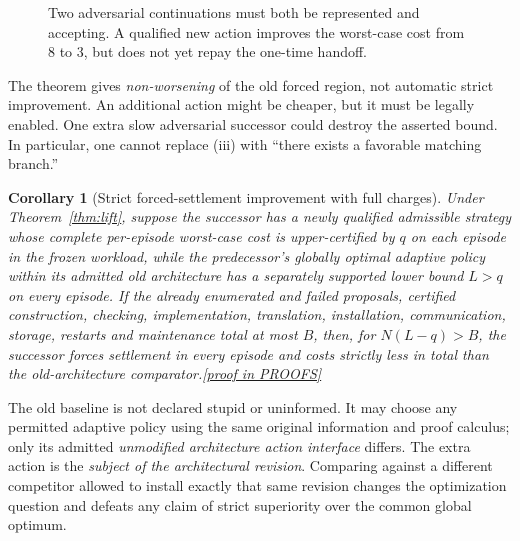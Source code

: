 \documentclass[11pt,letterpaper]{article}
\newtheorem{corollary}[theorem]{Corollary}
\theoremstyle{definition}
\theoremstyle{remark}
\newcommand{\prooflink}[1]{\hfill\hyperlink{proof:#1}{\footnotesize[proof in PROOFS]}}
\begin{document}
\begin{figure}[htbp]\centering
{}
\caption{Two adversarial continuations must both be represented and accepting. A qualified new action improves the worst-case cost from $8$ to $3$, but does not yet repay the one-time handoff.}\end{figure}

The theorem gives \emph{non-worsening} of the old forced region, not automatic strict improvement. An additional action might be cheaper, but it must be legally enabled. One extra slow adversarial successor could destroy the asserted bound. In particular, one cannot replace (iii) with ``there exists a favorable matching branch.''

\begin{corollary}[Strict forced-settlement improvement with full charges]\label{cor:strict}\hypertarget{claim:strict}{}
Under Theorem~\ref{thm:lift}, suppose the successor has a newly qualified admissible strategy whose complete per-episode worst-case cost is \emph{upper-certified} by $q$ on each episode in the frozen workload, while the predecessor's globally optimal adaptive policy \emph{within its admitted old architecture} has a separately supported lower bound $L>q$ on every episode. If the already enumerated and failed proposals, certified construction, checking, implementation, translation, installation, communication, storage, restarts and maintenance total at most $B$, then, for $N(L-q)>B$, the successor forces settlement in every episode and costs strictly less in total than the old-architecture comparator.\prooflink{strict}
\end{corollary}

The old baseline is not declared stupid or uninformed. It may choose any permitted adaptive policy using the same original information and proof calculus; only its admitted \emph{unmodified architecture action interface} differs. The extra action is the \emph{subject of the architectural revision}. Comparing against a different competitor allowed to install exactly that same revision changes the optimization question and defeats any claim of strict superiority over the common global optimum.
\end{document}
